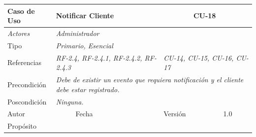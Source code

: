 \begin{table}[H]
    \begin{tabular}{|llllllll|}
    \hline
    \multicolumn{1}{|l|}{\cellcolor[HTML]{F2F2F2}Caso de Uso}           & \multicolumn{5}{l|}{Notificar Cliente}                                                                       & \multicolumn{2}{l|}{\cellcolor[HTML]{E6E6E6}CU-18}             \\ \hline
    \multicolumn{1}{|l|}{{\color[HTML]{808080} \textit{Actores}}}       & \multicolumn{7}{l|}{{\color[HTML]{808080} \textit{Administrador}}}                                                                                                      \\ \hline
    \multicolumn{1}{|l|}{Tipo}                                          & \multicolumn{7}{l|}{{\color[HTML]{808080} \textit{Primario, Esencial}}}                                                                                                                           \\ \hline
    \multicolumn{1}{|l|}{Referencias}                                   & \multicolumn{4}{l|}{{\color[HTML]{808080} \textit{RF-2.4, RF-2.4.1, RF-2.4.2, RF-2.4.3}}}                & \multicolumn{3}{l|}{{\color[HTML]{808080} \textit{CU-14, CU-15, CU-16, CU-17}}} \\ \hline
    \multicolumn{1}{|l|}{Precondici\'on}                                  & \multicolumn{7}{p{8cm}|}{{\color[HTML]{808080} \textit{Debe de existir un evento que requiera notificaci\'on y el cliente debe estar registrado.}}}                                                                                                      \\ \hline
    \multicolumn{1}{|l|}{Poscondici\'on}                                  & \multicolumn{7}{l|}{{\color[HTML]{808080} \textit{Ninguna.}}}                                                                                                                                                                             \\ \hline
    \multicolumn{1}{|l|}{Autor}                                         & \multicolumn{1}{l|}{}                         & \multicolumn{2}{l|}{Fecha}             & \multicolumn{1}{l|}{}        & \multicolumn{2}{l|}{Versi\'on}             & 1.0                            \\ \hline
    \multicolumn{8}{|l|}{Prop\'osito}                                                                                                                                                                                                                                         \\ \hline

\end{tabular}
\end{table}
